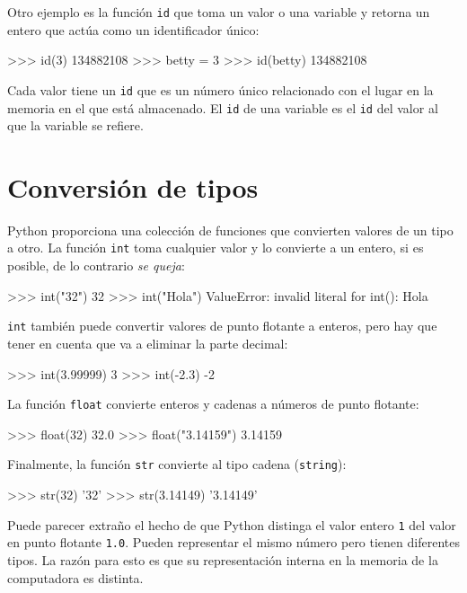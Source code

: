 Otro  ejemplo es la función \texttt{id} que toma un valor o una variable y
retorna un entero que actúa como un identificador único:

\beforeverb
\begin{pyconcode}
>>> id(3)
134882108
>>> betty = 3
>>> id(betty)
134882108
\end{pyconcode}
\afterverb
%

Cada valor tiene un \texttt{id} que es un número único relacionado con el 
lugar en la memoria en el que está almacenado. El  \texttt{id} de una
variable es el \texttt{id} del valor al que la variable se refiere.

\section{Conversión de tipos}

Python proporciona una colección de funciones que convierten valores de un
tipo a otro. La función  \texttt{int} toma cualquier valor y lo 
convierte a un entero, si es posible, de lo contrario \textit{se queja}:

\beforeverb
\begin{pyconcode}
>>> int("32")
32
>>> int("Hola")
ValueError: invalid literal for int(): Hola
\end{pyconcode}
\afterverb
%

\texttt{int} también puede convertir valores de punto flotante a enteros, 
pero hay que tener en cuenta que va a eliminar la parte decimal:

\beforeverb
\begin{pyconcode}
>>> int(3.99999)
3
>>> int(-2.3)
-2
\end{pyconcode}
\afterverb
%

La función \texttt{float} convierte enteros y cadenas a números de 
punto flotante:

\beforeverb
\begin{pyconcode}
>>> float(32)
32.0
>>> float("3.14159")
3.14159
\end{pyconcode}
\afterverb
%

Finalmente, la función \texttt{str} convierte al tipo cadena
(\texttt{string}):

\beforeverb
\begin{pyconcode}
>>> str(32)
'32'
>>> str(3.14149)
'3.14149'
\end{pyconcode}
\afterverb
%

Puede parecer extraño el hecho de que Python distinga el valor entero \texttt{1}
del valor en punto flotante \texttt{1.0}. Pueden representar el mismo número
pero tienen diferentes tipos. La razón para esto es que su representación 
interna en la memoria de la computadora es distinta.

